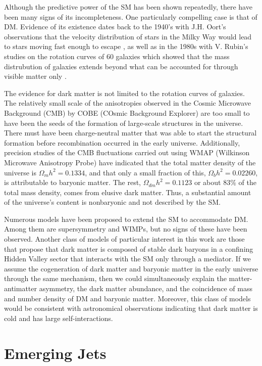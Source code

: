Although the predictive power of the SM has been shown repeatedly, there have been many signs of its incompleteness. One particularly compelling case is that of DM. Evidence of its existence dates back to the 1940's with J.H. Oort's observations that the velocity distribution of stars in the Milky Way would lead to stars moving fast enough to escape \cite{oortProblemsConcerningStructure1940}, as well as in the 1980s with V. Rubin's studies on the rotation curves of 60 galaxies which showed that the mass distrubution of galaxies extends beyond what can be accounted for through visible matter only \cite{rubinDarkMatterSpiral1983}.

The evidence for dark matter is not limited to the rotation curves of galaxies. The relatively small scale of the anisotropies observed in the Cosmic Microwave Background (CMB) by COBE (COsmic Background Explorer) are too small to have been the seeds of the formation of large-scale structures in the universe. There must have been charge-neutral matter that was able to start the structural formation before recombination occurred in the early universe. Additionally, precision studies of the CMB fluctuations carried out using WMAP (Wilkinson Microwave Anisotropy Probe) have indicated that the total matter density of the universe is $\Omega_{m}h^2 = 0.1334$, and that only a small fraction of this, $\Omega_{b}h^2 = 0.02260$, is attributable to baryonic matter. The rest, $\Omega_{dm}h^2 = 0.1123$ or about $83\%$ of the total mass density, comes from elusive dark matter. Thus, a substantial amount of the universe's content is nonbaryonic and not described by the SM.

Numerous models have been proposed to extend the SM to accommodate DM. Among them are supersymmetry and WIMPs, but no signs of these have been observed. Another class of models of particular interest in this work are those that propose that dark matter is composed of stable dark baryons in a confining Hidden Valley sector that interacts with the SM only through a mediator. If we assume the cogeneration of dark matter and baryonic matter in the early universe through the same mechanism, then we could simultaneously explain the matter-antimatter asymmetry, the dark matter abundance, and the coincidence of mass and number density of DM and baryonic matter. Moreover, this class of models would be consistent with astronomical observations indicating that dark matter is cold and has large self-interactions.


\section{Emerging Jets}
\label{sec:EMJs}

